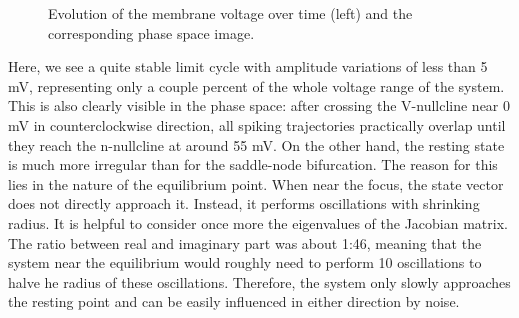 \documentclass[12pt,a4paper]{article}
\begin{document}
\begin{figure}[H]
	\hspace*{-0.5cm}
	
	\caption{Evolution of the membrane voltage over time (left) and the corresponding phase space image.}
	\label{ppcompanhopf}
\end{figure}
Here, we see a quite stable limit cycle with amplitude variations of less than 5 mV, representing only a couple percent of the whole voltage range of the system. This is also clearly visible in the phase space: after crossing the V-nullcline near 0 mV in counterclockwise direction, all spiking trajectories practically overlap until they reach the n-nullcline at around 55 mV. On the other hand, the resting state is much more irregular than for the saddle-node bifurcation. The reason for this lies in the nature of the equilibrium point. When near the focus, the state vector does not directly approach it. Instead, it performs oscillations with shrinking radius. It is helpful to consider once more the eigenvalues of the Jacobian matrix. The ratio between real and imaginary part was about 1:46, meaning that the system near the equilibrium would roughly need to perform 10 oscillations to halve he radius of these oscillations. Therefore, the system only slowly approaches the resting point and can be easily influenced in either direction by noise.
\end{document}
